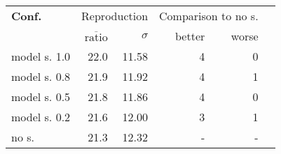 \begin{tabular}{ l r r | r r r }
\hline 
\textbf{Conf.} & \multicolumn{2}{c|}{Reproduction} & \multicolumn{2}{c}{Comparison to no s.} \\ 
  & $\overline{\text{ratio}}$ & $\sigma$ & better & worse \\ 
\hline 
model s. 1.0 & 22.0 & 11.58 & 4 & 0 \\ 
model s. 0.8 & 21.9 & 11.92 & 4 & 1 \\ 
model s. 0.5 & 21.8 & 11.86 & 4 & 0 \\ 
model s. 0.2 & 21.6 & 12.00 & 3 & 1 \\ 
no s. & 21.3 & 12.32 & - & - \\ 
\hline 
\end{tabular}